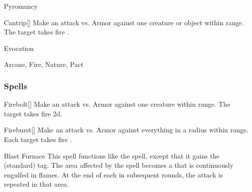 \newpage
\begin{spellsection}{Pyromancy}

\begin{spellheader}
\end{spellheader}


\begin{ability}{Cantrip}[]
Make an attack vs. Armor against one creature or object within \rngmed range.
\hit The target takes fire .
\end{ability}




 Evocation

 Arcane, Fire, Nature, Pact
\end{spellsection}


\subsubsection{Spells}


\lowercase{\hypertarget{spell:Firebolt}{}}\label{spell:Firebolt}
\begin{ability}[\nth{1}]{\hypertarget{spell:Firebolt}{Firebolt}}[]
Make an attack vs. Armor against one creature within \rngmed range.
\hit The target takes fire  \plus2d.
\end{ability}
\vspace{0.25em}



\lowercase{\hypertarget{spell:Fireburst}{}}\label{spell:Fireburst}
\begin{ability}[\nth{1}]{\hypertarget{spell:Fireburst}{Fireburst}}[]
Make an attack vs. Armor against everything in a \areasmall radius within \rngclose range.
\hit Each target takes fire .
\end{ability}
\vspace{0.25em}



\lowercase{\hypertarget{spell:Blast Furnace}{}}\label{spell:Blast Furnace}
\begin{ability}[\nth{2}]{\hypertarget{spell:Blast Furnace}{Blast Furnace}}
This spell functions like the  spell, except that it gains the  (standard) tag.
The area affected by the spell becomes a  that is continuously engulfed in flames.
At the end of each  in subsequent rounds, the attack is repeated in that area.
\end{ability}
\vspace{0.25em}



